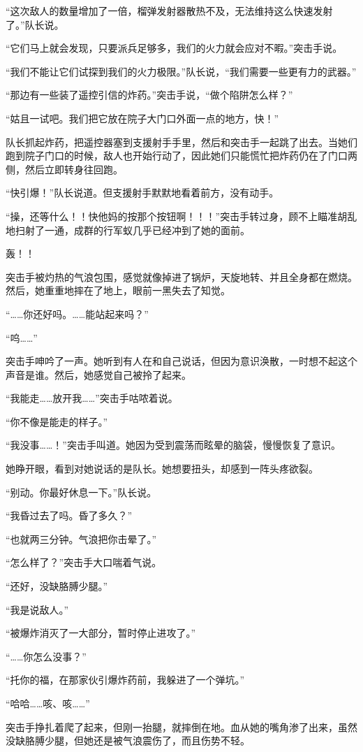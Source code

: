 “这次敌人的数量增加了一倍，榴弹发射器散热不及，无法维持这么快速发射了。”队长说。

“它们马上就会发现，只要派兵足够多，我们的火力就会应对不暇。”突击手说。

“我们不能让它们试探到我们的火力极限。”队长说，“我们需要一些更有力的武器。”

“那边有一些装了遥控引信的炸药。”突击手说，“做个陷阱怎么样？”

“姑且一试吧。我们把它放在院子大门口外面一点的地方，快！”

队长抓起炸药，把遥控器塞到支援射手手里，然后和突击手一起跳了出去。当她们跑到院子门口的时候，敌人也开始行动了，因此她们只能慌忙把炸药仍在了门口两侧，然后立即转身往回跑。

“快引爆！”队长说道。但支援射手默默地看着前方，没有动手。

“操，还等什么！！快他妈的按那个按钮啊！！！”突击手转过身，顾不上瞄准胡乱地扫射了一通，成群的行军蚁几乎已经冲到了她的面前。

轰！！

突击手被灼热的气浪包围，感觉就像掉进了锅炉，天旋地转、并且全身都在燃烧。然后，她重重地摔在了地上，眼前一黑失去了知觉。

“……你还好吗。……能站起来吗？”

“呜……”

突击手呻吟了一声。她听到有人在和自己说话，但因为意识涣散，一时想不起这个声音是谁。然后，她感觉自己被拎了起来。

“我能走……放开我……”突击手咕哝着说。

“你不像是能走的样子。”

“我没事……！”突击手叫道。她因为受到震荡而眩晕的脑袋，慢慢恢复了意识。

她睁开眼，看到对她说话的是队长。她想要扭头，却感到一阵头疼欲裂。

“别动。你最好休息一下。”队长说。

“我昏过去了吗。昏了多久？”

“也就两三分钟。气浪把你击晕了。”

“怎么样了？”突击手大口喘着气说。

“还好，没缺胳膊少腿。”

“我是说敌人。”

“被爆炸消灭了一大部分，暂时停止进攻了。”

“……你怎么没事？”

“托你的福，在那家伙引爆炸药前，我躲进了一个弹坑。”

“哈哈……咳、咳……”

突击手挣扎着爬了起来，但刚一抬腿，就摔倒在地。血从她的嘴角渗了出来，虽然没缺胳膊少腿，但她还是被气浪震伤了，而且伤势不轻。

